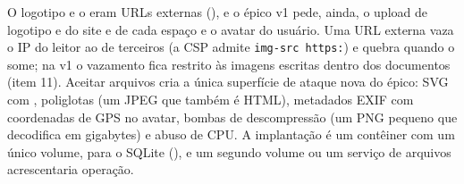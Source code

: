 {O logotipo e o  eram URLs externas (), e o épico v1 pede, ainda, o upload de logotipo e  do site e de cada espaço e o avatar do usuário. Uma URL externa vaza o IP do leitor ao  de terceiros (a CSP admite \texttt{img-src https:}) e quebra quando o  some; na v1 o vazamento fica restrito às imagens escritas dentro dos documentos (item 11). Aceitar arquivos cria a única superfície de ataque nova do épico: SVG com , poliglotas (um JPEG que também é HTML), metadados EXIF com coordenadas de GPS no avatar, bombas de descompressão (um PNG pequeno que decodifica em gigabytes) e abuso de CPU. A implantação é um contêiner com um único volume, para o SQLite (), e um segundo volume ou um serviço de arquivos acrescentaria operação.}
